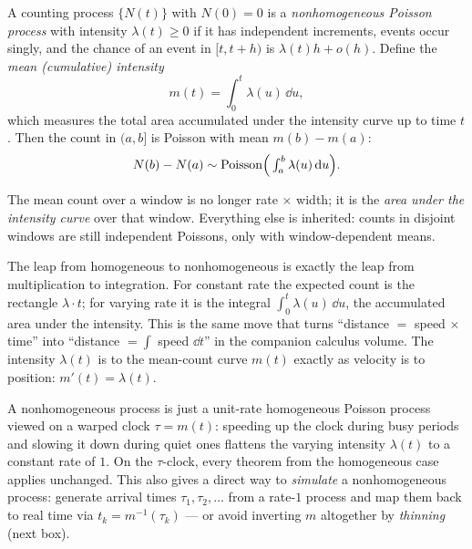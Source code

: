 \begin{definition}
\label{ch25:def-nonhomogeneous}
A counting process $\{N(t)\}$ with $N(0)=0$ is a \emph{nonhomogeneous Poisson
process} with intensity $\lambda(t) \ge 0$ if it has independent increments,
events occur singly, and the chance of an event in $[t, t+h)$ is $\lambda(t)h +
o(h)$. Define the \emph{mean (cumulative) intensity}
\[
m(t) = \int_0^t \lambda(u)\,\dd u,
\]
which measures the total area accumulated under the intensity curve up to time $t$.
Then the count in $(a,b]$ is Poisson with mean $m(b)-m(a)$:
\[
N(b)-N(a) \sim \operatorname{Poisson}\!\Big(\textstyle\int_a^b \lambda(u)\,\mathrm{d} u\Big).
\]
\end{definition}

The mean count over a window is no longer rate $\times$ width; it is the
\emph{area under the intensity curve} over that window. Everything else is
inherited: counts in disjoint windows are still independent Poissons, only with
window-dependent means.

\begin{connectionbox}
The leap from homogeneous to nonhomogeneous is exactly the leap from
multiplication to integration. For constant rate the expected count is the
rectangle $\lambda \cdot t$; for varying rate it is the integral $\int_0^t
\lambda(u)\,\dd u$, the accumulated area under the intensity. This is the same
move that turns ``distance $=$ speed $\times$ time'' into ``distance $=
\int$ speed $\dd t$'' in the companion calculus volume. The intensity
$\lambda(t)$ is to the mean-count curve $m(t)$ exactly as velocity is to
position: $m'(t) = \lambda(t)$.
\end{connectionbox}

\begin{happeningbox}
A nonhomogeneous process is just a unit-rate homogeneous Poisson process viewed on a warped
clock $\tau = m(t)$: speeding up the clock during busy periods and slowing it down during quiet
ones flattens the varying intensity $\lambda(t)$ to a constant rate of $1$. On the $\tau$-clock,
every theorem from the homogeneous case applies unchanged. This also gives a direct way to
\emph{simulate} a nonhomogeneous process: generate arrival times $\tau_1, \tau_2, \dots$ from a
rate-$1$ process and map them back to real time via $t_k = m^{-1}(\tau_k)$ --- or avoid
inverting $m$ altogether by \emph{thinning} (next box).
\end{happeningbox}

